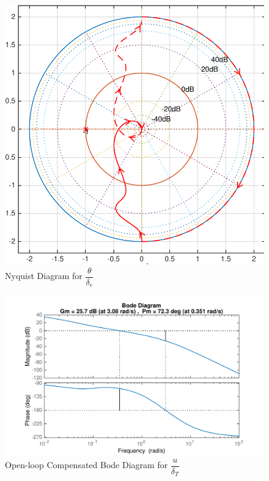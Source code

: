 \documentclass[11pt]{article}
\begin{document}
\begin{figure}[b!]
\begin{center}
\includegraphics[height=.4\textheight]{figures/nyquist_u}
\caption{Nyquist Diagram for $\dfrac{\theta}{\delta_e}$}
\end{center}
\end{figure}

\begin{figure}[h!]
\begin{center}
\includegraphics[height=.4\textheight]{figures/open_comp_u}
\caption{Open-loop Compensated Bode Diagram for $\dfrac{u}{\delta_T}$}
\end{center}
\end{figure}
\end{document}
